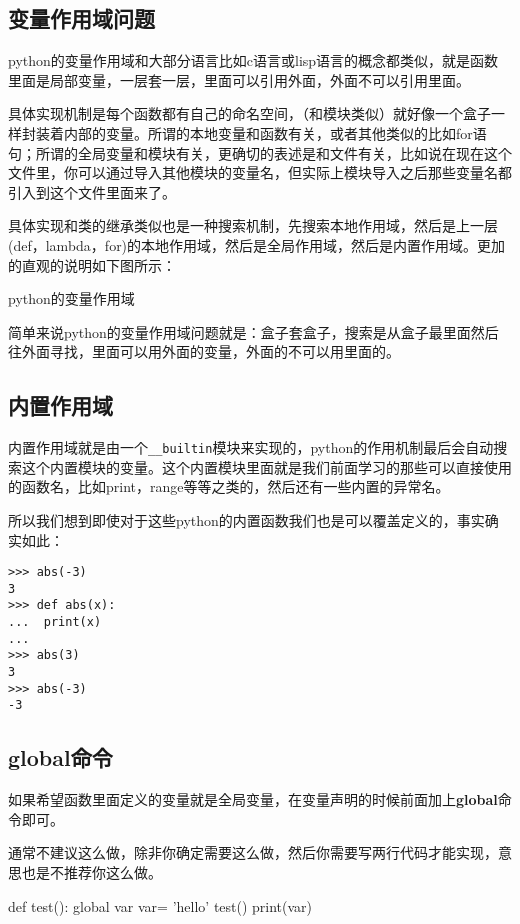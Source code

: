 \documentclass[12pt,oneside]{book}
\begin{document}
\begin{common-format}
\section{变量作用域问题}
python的变量作用域和大部分语言比如c语言或lisp语言的概念都类似，就是函数里面是局部变量，一层套一层，里面可以引用外面，外面不可以引用里面。

具体实现机制是每个函数都有自己的命名空间，（和模块类似）就好像一个盒子一样封装着内部的变量。所谓的本地变量和函数有关，或者其他类似的比如for语句；所谓的全局变量和模块有关，更确切的表述是和文件有关，比如说在现在这个文件里，你可以通过导入其他模块的变量名，但实际上模块导入之后那些变量名都引入到这个文件里面来了。

具体实现和类的继承类似也是一种搜索机制，先搜索本地作用域，然后是上一层(def，lambda，for)的本地作用域，然后是全局作用域，然后是内置作用域。更加的直观的说明如下图所示：
\begin{fig}{python的变量作用域}
\caption{python的变量作用域}
\label{fig:python的变量作用域}
\end{fig}

简单来说python的变量作用域问题就是：盒子套盒子，搜索是从盒子最里面然后往外面寻找，里面可以用外面的变量，外面的不可以用里面的。


\subsection{内置作用域}
内置作用域就是由一个\verb+__builtin+模块来实现的，python的作用机制最后会自动搜索这个内置模块的变量。这个内置模块里面就是我们前面学习的那些可以直接使用的函数名，比如print，range等等之类的，然后还有一些内置的异常名。

所以我们想到即使对于这些python的内置函数我们也是可以覆盖定义的，事实确实如此：
\begin{Verbatim}
>>> abs(-3)
3
>>> def abs(x):
...  print(x)
... 
>>> abs(3)
3
>>> abs(-3)
-3
\end{Verbatim}


\subsection{global命令}
如果希望函数里面定义的变量就是全局变量，在变量声明的时候前面加上\textbf{global}命令即可。

通常不建议这么做，除非你确定需要这么做，然后你需要写两行代码才能实现，意思也是不推荐你这么做。
\begin{tcbpython}
def test():
    global var
    var= 'hello'
test()
print(var)
\end{tcbpython}


\end{common-format}
\end{document}
